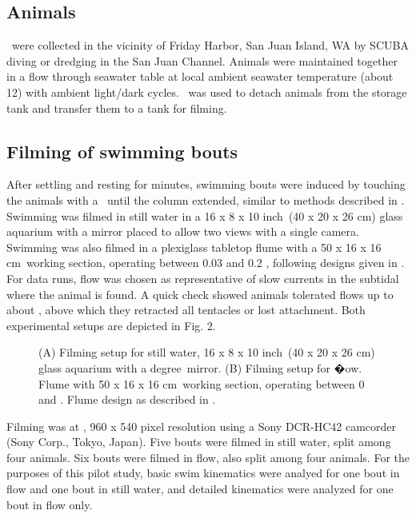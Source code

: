 \documentclass{jeb}
\newcommand{\Stomphia}{\Genus{S. coccinea}}
\newcommand{\Dimbricata}{\Genus{D. imbricata}}
\begin{document}
\subsection{Animals}
	\Stomphia\ were collected in the vicinity of Friday Harbor, San Juan Island, WA by SCUBA diving or dredging in the San Juan Channel.  Animals were maintained together in a flow through seawater table at local ambient seawater temperature (about 12\degC) with ambient light/dark cycles.  \Dimbricata\ was used to detach animals from the storage tank and transfer them to a tank for filming.   

\subsection{Filming of swimming bouts}
	After settling and resting for \unit[20]{minutes}, swimming bouts were induced by touching the animals with a \Dimbricata\ until the column extended, similar to methods described in \citep{Sund:1958}.  Swimming was filmed in still water in a 16 x 8 x 10 \unit{inch}\ (40 x 20 x 26 \unit{cm}) glass aquarium with a mirror placed to allow two views with a single camera.  Swimming was also filmed in a plexiglass tabletop flume with a 50 x 16 x 16 \unit{cm}\ working section, operating between 0.03 and 0.2 , following designs given in \citep{LaBarbera:1978}.  For data runs,  flow was chosen as representative of slow currents in the subtidal where the animal is found.  A quick check showed animals tolerated flows up to about , above which they retracted all tentacles or lost attachment.  Both experimental setups are depicted in Fig. 2. 

\begin{figure}
\caption{ (A) Filming setup for still water, 16 x 8 x 10 \unit{inch}\ (40 x 20 x 26 \unit{cm}) glass aquarium with a \unit[45]{degree}\ mirror.  (B) Filming setup for �ow.  Flume with 50 x 16 x 16 \unit{cm}\ working section, operating between 0 and .  Flume design as described in \citep{LaBarbera:1978}.}
\label{fig:2}
\end{figure}
	
Filming was at , 960 x 540 pixel resolution using a Sony DCR-HC42 camcorder (Sony Corp., Tokyo, Japan).    Five bouts were filmed in still water, split among four animals.  Six bouts were filmed in  flow, also split among four animals.  For the purposes of this pilot study, basic swim kinematics were analyed for one bout in flow and one bout in still water, and detailed kinematics were analyzed for one bout in flow only. 
\end{document}
